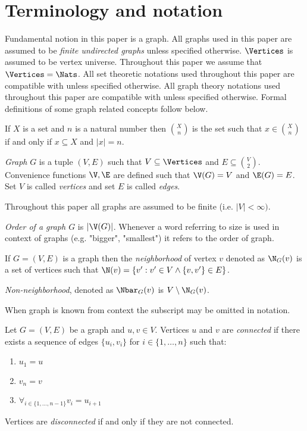
\section{Terminology and notation}

Fundamental notion in this paper is a graph. All graphs used in this paper are assumed to be \emph{finite undirected graphs} unless specified otherwise. $\Vertices$ is assumed to be vertex universe. Throughout this paper we assume that $\Vertices = \Nats$. All set theoretic notations used throughout this paper are compatible with \cite{jech} unless specified otherwise. All graph theory notations used throughout this paper are compatible with \cite{bollobas} unless specified otherwise. Formal definitions of some graph related concepts follow below.

\begin{defi}
    If $X$ is a set and $n$ is a natural number then $\binom{X}{n}$ is the set such that $x \in \binom{X}{n}$ if and only if $x \subseteq X$ and $|x| = n$.
\end{defi}

\begin{defi}
    \emph{Graph} $G$ is a tuple $(V,E)$ such that $V \subseteq \Vertices$ and $E \subseteq \binom{V}{2}$. Convenience functions $\V, \E$ are defined such that $\V(G) = V$ and $\E(G) = E$. Set $V$ is called \emph{vertices} and set $E$ is called \emph{edges}.
\end{defi}
Throughout this paper all graphs are assumed to be finite (i.e. $|V| < \infty)$.

\begin{defi}
    \emph{Order of a graph $G$} is $|\V(G)|$. Whenever a word referring to size is used in context of graphs (e.g. "bigger", "smallest") it refers to the order of graph.
\end{defi}

\begin{defi}
    If $G = (V,E)$ is a graph then the \emph{neighborhood} of vertex $v$ denoted as $\N_G(v)$ is a set of vertices such that $\N(v) = \{v' : v' \in V \land \{v, v'\} \in E\}$.

    \emph{Non-neighborhood}, denoted as $\Nbar_G(v)$ is $V \setminus \N_G(v)$.
\end{defi}
When graph is known from context the subscript may be omitted in notation.

\begin{defi}
    Let $G = (V,E)$ be a graph and $u, v \in V$. Vertices $u$ and $v$ are \emph{connected} if there exists a sequence of edges $\{u_i,v_i\}$ for $i \in \{1, \ldots, n\}$ such that:
    \begin{enumerate}
        \item $u_1 = u$
        \item $v_n = v$
        \item $\forall_{i \in \{1, \ldots, n - 1\}} v_i = u_{i+1}$
    \end{enumerate}

    Vertices are \emph{disconnected} if and only if they are not connected.
\end{defi}

